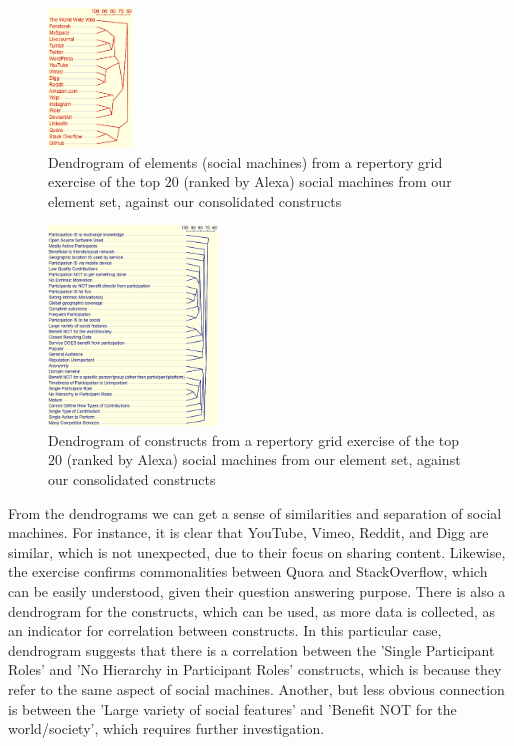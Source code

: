 \documentclass{sig-alternate}
\begin{document}
\begin{figure}[htb]
\begin{center}
\includegraphics[width=0.2\textwidth]{img/dendrogram-elements.png}
\caption{Dendrogram of elements (social machines) from a repertory grid exercise of the top $20$ (ranked by Alexa) social machines from our element set, against our consolidated constructs} \label{dendrogram}
\end{center}
\end{figure}

\begin{figure}[htb]
\begin{center}
\includegraphics[width=0.4\textwidth]{img/dendrogram-constructs.png}
\caption{Dendrogram of constructs from a repertory grid exercise of the top $20$ (ranked by Alexa) social machines from our element set, against our consolidated constructs} \label{dendrogram}
\end{center}
\end{figure}

From the dendrograms we can get a sense of similarities and separation of social machines. For
instance, it is clear that YouTube, Vimeo, Reddit, and Digg are similar, which is not unexpected, due to their focus on sharing content. Likewise, the exercise confirms commonalities between Quora and StackOverflow, which can be easily understood, given their question answering purpose. There is also a dendrogram for the constructs, which can be used, as more data is collected, as an indicator for correlation between constructs. In this particular case, dendrogram suggests that there is a correlation between the 'Single Participant Roles' and 'No Hierarchy in Participant Roles' constructs, which is because they refer to the same aspect of social machines. Another, but less obvious connection is between the 'Large variety of social features' and 'Benefit NOT for the world/society', which requires further investigation.
\end{document}
